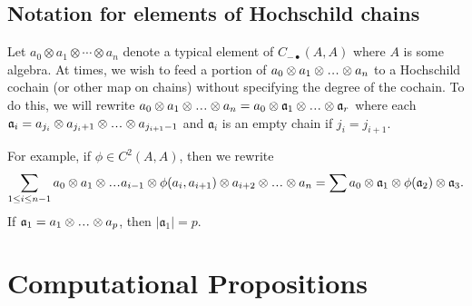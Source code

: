 \subsection{Notation for elements of Hochschild chains}
Let $a_0 \otimes a_1 \otimes \cdots \otimes a_n$ 
denote a typical element of $C_{-\bullet}(A,A)$ where 
$A$ is some algebra. At times, we wish to feed a portion 
of $a_0 \otimes a_1 \otimes \smdots \otimes a_n$ to a 
Hochschild cochain (or other map on chains) without 
specifying the degree of the cochain. To do this, 
we will rewrite $a_0 \otimes a_1 \otimes \smdots \otimes a_n 
= a_0 \otimes \mathfrak{a}_1 \otimes \smdots \otimes \mathfrak{a}_r$ 
where each $\mathfrak{a}_i = a_{j_i} \otimes a_{j_i+1} \otimes 
\smdots \otimes a_{j_{i+1}-1}$ and $\mathfrak{a}_i$ 
is an empty chain if $j_i = j_{i+1}$.

For example, if $\phi \in C^2(A,A)$, then we 
rewrite 
$$
\sum \limits_{1\leq i \leq n-1} 
a_0 \otimes a_1 \otimes \smdots a_{i-1} \otimes 
\phi(a_i, a_{i+1}) \otimes a_{i+2} \otimes \smdots \otimes a_n
=
\sum
a_0 \otimes \mathfrak{a}_1 \otimes \phi(\mathfrak{a}_2)
\otimes \mathfrak{a}_3.
$$
If $\mathfrak{a}_1 = a_1 \otimes \smdots \otimes a_p$, 
then $|\mathfrak{a}_1| = p$.

\section{Computational Propositions}




